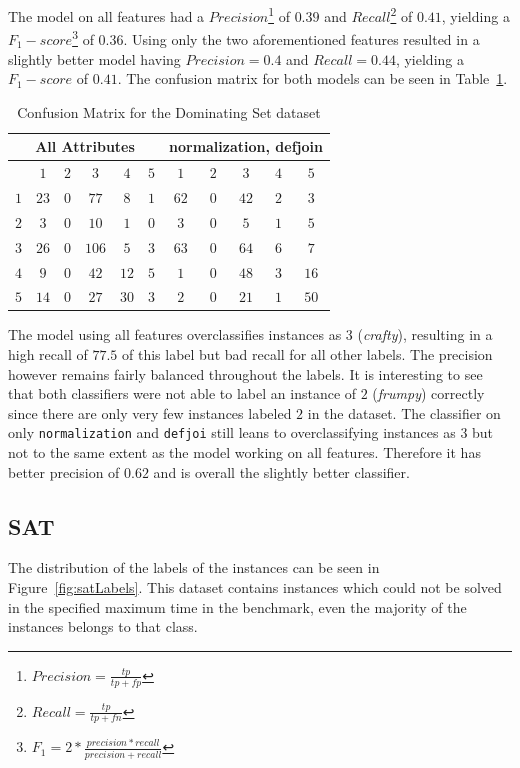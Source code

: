 \par The model on all features had a $Precision$\footnote{$Precision=\frac{tp}{tp+fp}$} of $0.39$ and $Recall$\footnote{$Recall=\frac{tp}{tp+fn}$} of $0.41$, yielding a $F_1-score$\footnote{$F_1=2*\frac{precision*recall}{precision+recall}$} of $0.36$. Using only the two aforementioned features resulted in a slightly better model having $Precision=0.4$ and $Recall=0.44$, yielding a $F_1-score$ of $0.41$. The confusion matrix for both models can be seen in Table~\ref{tbl:dsCM}. 
\begin{table}[h]
\center
	\begin{tabular}{|c|ccccc|ccccc|}
		\hline
		\multicolumn{6}{|c|}{All Attributes} &\multicolumn{5}{|c|}{normalization, defjoin}\\
		\hline &$1$&$2$&$3$&$4$&$5$&$1$&$2$&$3$&$4$&$5$\\
		 \hline$1$&$23$&$0$&$77$ &$8$ &$1$&$62$&$0$&$42$&$2$&$3$\\
		 $2$&$3$ &$0$&$10$ &$1$ &$0$&$3$ &$0$&$5$ &$1$&$5$\\
		 $3$&$26$&$0$&$106$&$5$ &$3$&$63$&$0$&$64$&$6$&$7$\\
		 $4$&$9$ &$0$&$42$ &$12$&$5$&$1$ &$0$&$48$&$3$&$16$\\
		 $5$&$14$&$0$&$27$ &$30$&$3$&$2$ &$0$&$21$&$1$&$50$\\
		 \hline
	\end{tabular}
	\caption{Confusion Matrix for the Dominating Set dataset}
	\label{tbl:dsCM}
\end{table}
\par The model using all features overclassifies instances as $3$ (\emph{crafty}), resulting in a high recall of $77.5$ of this label but bad recall for all other labels. The precision however remains fairly balanced throughout the labels. It is interesting to see that both classifiers were not able to label an instance of $2$ (\emph{frumpy}) correctly since there are only very few instances labeled $2$ in the dataset. The classifier on only \lstinline$normalization$ and \lstinline$defjoi$ still leans to overclassifying instances as $3$ but not to the same extent as the model working on all features.
Therefore it has better precision of $0.62$ and is overall the slightly better classifier.

\subsection{SAT}
The distribution of the labels of the instances can be seen in Figure~\ref{fig:satLabels}. This dataset contains instances which could not be solved in the specified maximum time in the benchmark, even the majority of the instances belongs to that class. 

